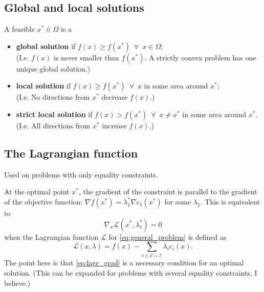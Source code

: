 \documentclass[a4paper, 12pt]{article}
\theoremstyle{definition}
\newcommand{\lagrange}{\mathcal{L}}
\newcommand{\Econ}{\mathcal{E}}
\newcommand{\Icon}{\mathcal{I}}
\newcommand{\enforall}{\enspace \forall \enspace}
\begin{document}
\subsection{Global and local solutions}
A feasible \(x^* \in \Omega\) is a
\begin{itemize}
	\item \textbf{global solution} if \(f(x) \geq f(x^*) \enforall x \in \Omega\); \\
	(I.e. \(f(x)\) is never smaller than \(f(x^*)\). A strictly convex problem has one unique global solution.)
	\item \textbf{local solution} if \(f(x) \geq f(x^*) \enforall x\) in some area around \(x^*\);\\
	(I.e. No directions from \(x^*\) decrease \(f(x)\).)
	\item \textbf{strict local solution} if \(f(x) > f(x^*) \enforall x \neq x^*\) in some area around \(x^*\).\\
	(I.e. All directions from \(x^*\) increase \(f(x)\).)
\end{itemize}

\subsection{The Lagrangian function}
Used on problems with only equality constraints.

At the optimal point \(x^*\), the gradient of the constraint is parallel to the gradient of the objective function: \(\nabla f(x^*) = \lambda_1^* \nabla c_1(x^*)\) for some \(\lambda_1\). This is equivalent to
\begin{equation}\label{eq:lagr_grad}
	\nabla_x \lagrange(x^*, \lambda_1^*) = 0
\end{equation}
when the Lagrangian function \(\lagrange\) for \eqref{eq:general_problem} is defined as
\begin{equation}
	\lagrange (x, \lambda) = f(x) - \sum_{i \in \Econ \cup \Icon} \lambda_i c_i(x).
\end{equation}
The point here is that \eqref{eq:lagr_grad} is a necessary condition for an optimal solution. (This can be expanded for problems with several equality constraints, I believe.)
\end{document}

